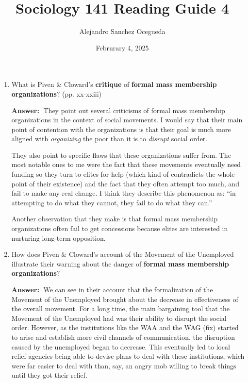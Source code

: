 \documentclass{article}
\title{Sociology 141 Reading Guide 4}
\author{Alejandro Sanchez Ocegueda}
\date{Februrary 4, 2025}
\newcommand{\answer}{\textbf{Answer:}$\;$}
\begin{document}
\maketitle

\begin{enumerate}[label=\arabic*)]
    \item What is Piven \& Cloward's \textbf{critique} of \textbf{formal mass membership organizations}? (pp. xx-xxiii)
    
    \answer 
    They point out several criticisms of formal mass membership organizations in the context of social movements. 
    I would say that their main point of contention with the organizations is that their goal is much more aligned with \textit{organizing} the poor than it is to \textit{disrupt} social order.
    
    They also point to specific flaws that these organizations suffer from.
    The most notable ones to me were the fact that these movements eventually need funding so they turn to elites for help (which kind of contradicts the whole point of their existence) and the fact that they often attempt too much, and fail to make any real change.
    I think they describe this phenomenon as: ``in attempting to do what they cannot, they fail to do what they can.''

    Another observation that they make is that formal mass membership organizations often fail to get concessions because elites are interested in nurturing long-term opposition.
    
    \item How does Piven \& Cloward's account of the Movement of the Unemployed illustrate their warning about the danger of \textbf{formal mass membership organizations}?
    
    \answer 
    We can see in their account that the formalization of the Movement of the Unemployed brought about the decrease in effectiveness of the overall movement.
    For a long time, the main bargaining tool that the Movement of the Unemployed had was their ability to disrupt the social order.
    However, as the institutions like the WAA and the WAG (fix) started to arise and establish more civil channels of communication, the disruption caused by the unemployed began to decrease.
    This eventually led to local relief agencies being able to devise plans to deal with these institutions, which were far easier to deal with than, say, an angry mob willing to break things until they got their relief.
    

\end{enumerate}
\end{document}
